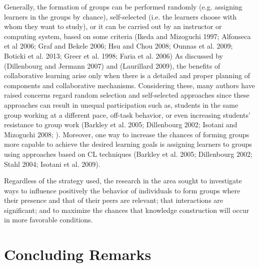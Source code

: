 Generally, the formation of groups can be performed randomly (e.g. assigning learners in the groups by chance), self-selected (i.e. the learners choose with whom they want to study), or it can be carried out by an instructor or computing system, based on some criteria (Ikeda and Mizoguchi 1997; Alfonseca et al 2006; Graf and Bekele 2006; Hsu and Chou 2008; Ounnas et al. 2009; Boticki et al. 2013; Greer et al. 1998; Faria et al. 2006)
As discussed by (Dillenbourg and Jermann 2007) and (Laurillard 2009), the benefits of collaborative learning arise only when there is a detailed and proper planning of components and collaborative mechanisms. Considering these, many authors have raised concerns regard random selection and self-selected approaches since these approaches can result in unequal participation such as, students in the same group working at a different pace, off-task behavior, or even increasing students’ resistance to group work (Barkley et al. 2005; Dillenbourg 2002; Isotani and Mizoguchi 2008; ). Moreover, one way to increase the chances of forming groups more capable to achieve the desired learning goals is assigning learners to groups using approaches based on CL techniques (Barkley et al. 2005; Dillenbourg 2002; Stahl 2004; Isotani et al. 2009).

Regardless of the strategy used, the research in the area sought to investigate ways to influence positively the behavior of individuals to form groups where their presence and that of their peers are relevant; that interactions are significant; and to maximize the chances that knowledge construction will occur in more favorable conditions. 

\section{Concluding Remarks}

